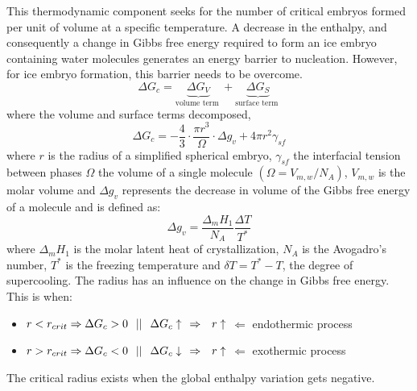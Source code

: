 \setlength{\parindent}{0.5cm} This thermodynamic component seeks for the number of critical embryos formed per unit of volume at a specific temperature. A decrease in the enthalpy, and consequently a change in Gibbs free energy required to form an ice embryo containing water molecules generates an energy barrier to nucleation. However, for ice embryo formation, this barrier needs to be overcome. 
\begin{equation}
	\label{2.16}
	\Delta G_{c}=\underbrace{\Delta G_{V}}_{\text {volume term }}+\underbrace{\Delta G_{S}}_{\text {surface term }}
\end{equation}
where the volume and surface terms decomposed,
\begin{equation}
	\label{2.17}
	\Delta G_{c}=-\frac{4}{3} \cdot \frac{\pi r^{3}}{\Omega} \cdot \Delta g_{v}+4 \pi r^{2} \gamma_{s f}
\end{equation}
where $r$ is the radius of a simplified spherical embryo, $\gamma_{sf}$ the interfacial tension between phases $\Omega$ the volume of a single molecule $
\left(\Omega=V_{m, w} / N_{A}\right)$, $V_{m, w}$ is the molar volume and $\Delta g_{v}$ represents the decrease in volume of the Gibbs free energy of a molecule and is defined as:
\begin{equation}
	\label{2.18}
	\Delta g_{v}=\frac{\Delta_{m} H_{1}}{N_{A}} \frac{\Delta T}{T^{*}}
\end{equation}
where $\Delta_{m} H_{1}$ is the molar latent heat of crystallization, $N_{A}$ is the Avogadro's number, $T^{*}$ is the freezing temperature and $\delta T=T^* - T$, the degree of supercooling.
The radius has an influence on the change in Gibbs free energy. This is when:
\begin{itemize}
	\item $r < r_{crit} \Rightarrow \Delta G_{c} > 0 \hspace{0.25cm} || \hspace{0.25cm} \Delta G_{c} \uparrow \hspace{0.25cm} \Rightarrow \hspace{0.25cm} r \uparrow $ $\Leftarrow$ endothermic process
	\item $r > r_{crit} \Rightarrow \Delta G_{c} < 0 \hspace{0.25cm} || \hspace{0.25cm} \Delta G_{c} \downarrow \hspace{0.25cm} \Rightarrow \hspace{0.25cm} r \uparrow $ $\Leftarrow$ exothermic process
\end{itemize}
The critical radius exists when the global enthalpy variation gets negative.

